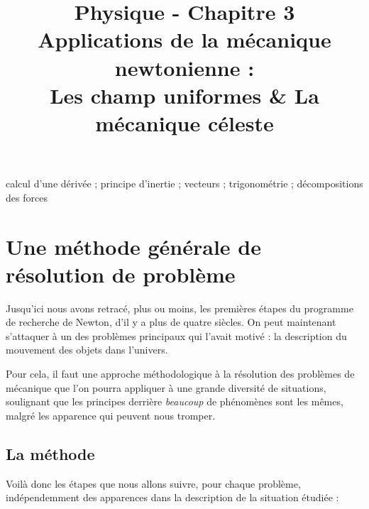 \documentclass[11pt,a4paper]{article}
\title{\large Physique - Chapitre 3 \\ \LARGE Applications de la mécanique newtonienne :  \\ \large Les champ uniformes \& La mécanique céleste}
\date{}
\author{}
\begin{document}
\maketitle
\vspace{-1cm}
\begin{tcolorbox}[title=Notions de la classe de première à rappeler]
calcul d'une dérivée ; principe d'inertie ; vecteurs ; trigonométrie ; décompositions des forces
\end{tcolorbox}
\tableofcontents

\section{Une méthode générale de résolution de problème}

Jusqu’ici nous avons retracé, plus ou moins, les premières étapes du programme de recherche de Newton, d’il y a plus de quatre siècles. On peut maintenant s’attaquer à un des problèmes principaux qui l’avait motivé : la description du mouvement des objets dans l’univers. 

Pour cela, il faut une approche méthodologique à la résolution des problèmes de mécanique que l'on pourra appliquer à une grande diversité de situations, soulignant que les principes derrière \textit{beaucoup} de phénomènes sont les mêmes, malgré les apparence qui peuvent nous tromper. 


\subsection{La méthode}

Voilà donc les étapes que nous allons suivre, pour chaque problème, indépendemment des apparences dans la description de la situation étudiée : 
\newpage
\end{document}
